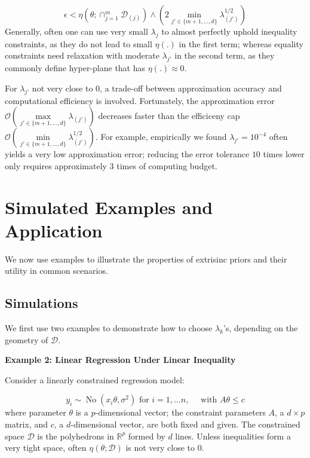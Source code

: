 \documentclass[10pt]{article}
\newcommand{\bb}[1]{\mathbb{#1}}
\newcommand{\mc}[1]{\mathcal{#1}}
\DeclareMathOperator{\No}{No}
\DeclareMathOperator{\1}{\mathbbm{1}}
\newcommand{\dt}{\epsilon} %
\begin{document}
\begin{equation}
\label{optimalStabilityCondition}
\dt <  \eta(\theta;{\cap_{j=1}^m \mc D_{(j)}})  \wedge \left(2 \min_{j'\in \{m+1,\ldots,d\}}\lambda_{(j')}^{1/2}\right)
\end{equation}
Generally, often one can use very small $\lambda_j$ to almost perfectly uphold inequality constraints, as they do not lead to small $\eta(.)$ in the first term; whereas equality constraints need relaxation with moderate $\lambda_{j'}$ in the second term, as they commonly define hyper-plane that has $\eta(.)\approx 0$.

For $\lambda_{j'}$ not very close to $0$, a trade-off between approximation accuracy and computational efficiency is involved. Fortunately,  the approximation error $\mc O( \underset{j'\in \{m+1,\ldots,d\}} \max\lambda_{(j')})$ decreases faster than the efficiceny cap $\mc O( \underset{j'\in \{m+1,\ldots,d\}} \min\lambda^{1/2}_{(j')})$. For example, empirically we found $\lambda_{j'}=10^{-4}$ often yields a very low approximation error; reducing the error tolerance $10$ times 
lower only requires approximately $3$ times of computing budget.


\section{Simulated Examples and Application}

We now use examples to illustrate the properties of extrisinc priors and their utility in common scenarios.

\subsection{Simulations}

We first use two examples to demonstrate how to choose $\lambda_{k}$'s, depending on the geometry of $\mc D$.

{\bf Example 2: Linear Regression Under Linear Inequality}

Consider a linearly constrained regression model:

$$y_i \sim \No (x_i \theta, \sigma^2) \text{ for } i=1,\ldots n, \quad\text{ with } A\theta \le c$$
where parameter $\theta$ is a $p$-dimensional vector; the constraint parameters $A$, a $d\times p$ matrix, and $c$, a $d$-dimensional vector, are both fixed and given. The constrained space  $\mc D$ is the polyhedrons in $\bb R^p$ formed by $d$ lines. Unless inequalities form a very tight space, often $\eta(\theta;\mc D)$ is not very close to $0$. 
\end{document}
